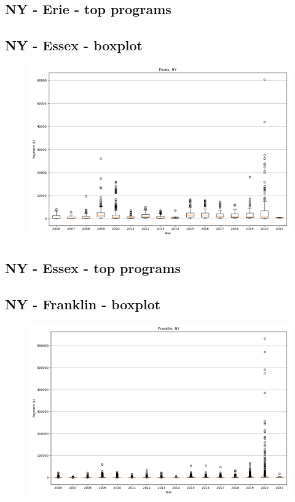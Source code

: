 \subsection*{NY - Erie - top programs}

\newpage
\subsection*{NY - Essex - boxplot}
\begin{figure}[h]
\centering
\includegraphics[width=7in]{../output/boxplots/counties/Essex-NY_boxplot.png}
\end{figure}


\subsection*{NY - Essex - top programs}

\newpage
\subsection*{NY - Franklin - boxplot}
\begin{figure}[h]
\centering
\includegraphics[width=7in]{../output/boxplots/counties/Franklin-NY_boxplot.png}
\end{figure}


